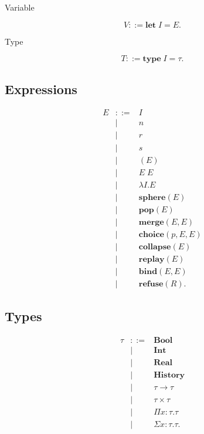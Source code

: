 \documentclass[12pt,oneside]{article}
\theoremstyle{definition}
\theoremstyle{remark}
\begin{document}
Variable

\[
V
::=
\mathbf{let}
\;
I
=
E.
\]

Type

\[
T
::=
\mathbf{type}
\;
I
=
\tau.
\]

\subsection*{Expressions}

\[
\begin{array}{rcl}
E
&::=&
I
\\
&
\mid&
n
\\
&
\mid&
r
\\
&
\mid&
s
\\
&
\mid&
(E)
\\
&
\mid&
E\;E
\\
&
\mid&
\lambda
I.E
\\
&
\mid&
\mathbf{sphere}(E)
\\
&
\mid&
\mathbf{pop}(E)
\\
&
\mid&
\mathbf{merge}(E,E)
\\
&
\mid&
\mathbf{choice}(p,E,E)
\\
&
\mid&
\mathbf{collapse}(E)
\\
&
\mid&
\mathbf{replay}(E)
\\
&
\mid&
\mathbf{bind}(E,E)
\\
&
\mid&
\mathbf{refuse}(R).
\end{array}
\]

\subsection*{Types}

\[
\begin{array}{rcl}
\tau
&::=&
\mathbf{Bool}
\\
&
\mid&
\mathbf{Int}
\\
&
\mid&
\mathbf{Real}
\\
&
\mid&
\mathbf{History}
\\
&
\mid&
\tau
\rightarrow
\tau
\\
&
\mid&
\tau
\times
\tau
\\
&
\mid&
\Pi
x:\tau.
\tau
\\
&
\mid&
\Sigma
x:\tau.
\tau.
\end{array}
\]
\end{document}
